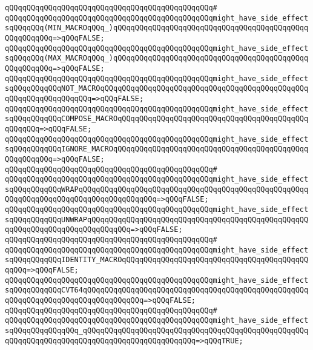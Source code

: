 \verb|qQQqqQQqqQQqqQQqqQQqqQQqqQQqqQQqqQQqqQQqqQQqqQQq#|\newline
\verb|qQQqqQQqqQQqqQQqqQQqqQQqqQQqqQQqqQQqqQQqqQQqqQQqmight_have_side_effectsqQQqqQQq(MIN_MACROqQQq_)qQQqqQQqqQQqqQQqqQQqqQQqqQQqqQQqqQQqqQQqqQQqqQQqqQQqqQQq=>qQQqFALSE;|\newline
\verb|qQQqqQQqqQQqqQQqqQQqqQQqqQQqqQQqqQQqqQQqqQQqqQQqmight_have_side_effectsqQQqqQQq(MAX_MACROqQQq_)qQQqqQQqqQQqqQQqqQQqqQQqqQQqqQQqqQQqqQQqqQQqqQQqqQQqqQQq=>qQQqFALSE;|\newline
\verb|qQQqqQQqqQQqqQQqqQQqqQQqqQQqqQQqqQQqqQQqqQQqqQQqmight_have_side_effectsqQQqqQQqqQQqNOT_MACROqQQqqQQqqQQqqQQqqQQqqQQqqQQqqQQqqQQqqQQqqQQqqQQqqQQqqQQqqQQqqQQqqQQq=>qQQqFALSE;|\newline
\verb|qQQqqQQqqQQqqQQqqQQqqQQqqQQqqQQqqQQqqQQqqQQqqQQqmight_have_side_effectsqQQqqQQqqQQqCOMPOSE_MACROqQQqqQQqqQQqqQQqqQQqqQQqqQQqqQQqqQQqqQQqqQQqqQQqqQQq=>qQQqFALSE;|\newline
\verb|qQQqqQQqqQQqqQQqqQQqqQQqqQQqqQQqqQQqqQQqqQQqqQQqmight_have_side_effectsqQQqqQQqqQQqIGNORE_MACROqQQqqQQqqQQqqQQqqQQqqQQqqQQqqQQqqQQqqQQqqQQqqQQqqQQqqQQq=>qQQqFALSE;|\newline
\verb|qQQqqQQqqQQqqQQqqQQqqQQqqQQqqQQqqQQqqQQqqQQqqQQq#|\newline
\verb|qQQqqQQqqQQqqQQqqQQqqQQqqQQqqQQqqQQqqQQqqQQqqQQqmight_have_side_effectsqQQqqQQqqQQqWRAPqQQqqQQqqQQqqQQqqQQqqQQqqQQqqQQqqQQqqQQqqQQqqQQqqQQqqQQqqQQqqQQqqQQqqQQqqQQqqQQqqQQqqQQq=>qQQqFALSE;|\newline
\verb|qQQqqQQqqQQqqQQqqQQqqQQqqQQqqQQqqQQqqQQqqQQqqQQqmight_have_side_effectsqQQqqQQqqQQqUNWRAPqQQqqQQqqQQqqQQqqQQqqQQqqQQqqQQqqQQqqQQqqQQqqQQqqQQqqQQqqQQqqQQqqQQqqQQqqQQqqQQq=>qQQqFALSE;|\newline
\verb|qQQqqQQqqQQqqQQqqQQqqQQqqQQqqQQqqQQqqQQqqQQqqQQq#|\newline
\verb|qQQqqQQqqQQqqQQqqQQqqQQqqQQqqQQqqQQqqQQqqQQqqQQqmight_have_side_effectsqQQqqQQqqQQqIDENTITY_MACROqQQqqQQqqQQqqQQqqQQqqQQqqQQqqQQqqQQqqQQqqQQqqQQq=>qQQqFALSE;|\newline
\verb|qQQqqQQqqQQqqQQqqQQqqQQqqQQqqQQqqQQqqQQqqQQqqQQqmight_have_side_effectsqQQqqQQqqQQqCVT64qQQqqQQqqQQqqQQqqQQqqQQqqQQqqQQqqQQqqQQqqQQqqQQqqQQqqQQqqQQqqQQqqQQqqQQqqQQqqQQqqQQq=>qQQqFALSE;|\newline
\verb|qQQqqQQqqQQqqQQqqQQqqQQqqQQqqQQqqQQqqQQqqQQqqQQq#|\newline
\verb|qQQqqQQqqQQqqQQqqQQqqQQqqQQqqQQqqQQqqQQqqQQqqQQqmight_have_side_effectsqQQqqQQqqQQqqQQq_qQQqqQQqqQQqqQQqqQQqqQQqqQQqqQQqqQQqqQQqqQQqqQQqqQQqqQQqqQQqqQQqqQQqqQQqqQQqqQQqqQQqqQQqqQQqqQQq=>qQQqTRUE;|\newline
